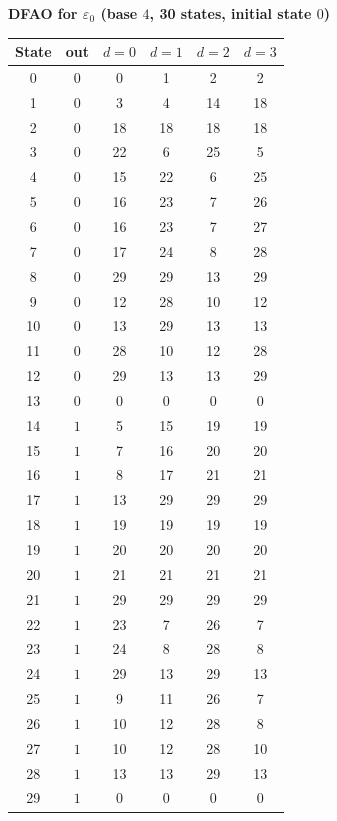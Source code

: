 \documentclass[12pt]{article}
\theoremstyle{definition}
\theoremstyle{remark}
\begin{document}
\noindent\begin{minipage}{\linewidth}
\textbf{DFAO for $\varepsilon_0$ (base $4$, 30 states, initial state $0$)}

\begin{center}
\renewcommand{\arraystretch}{1.1}
\begin{tabular}{c|c|cccc}
State & out & $d=0$ & $d=1$ & $d=2$ & $d=3$ \\\hline
0 & $0$ & 0 & 1 & 2 & 2 \\
1 & $0$ & 3 & 4 & 14 & 18 \\
2 & $0$ & 18 & 18 & 18 & 18 \\
3 & $0$ & 22 & 6 & 25 & 5 \\
4 & $0$ & 15 & 22 & 6 & 25 \\
5 & $0$ & 16 & 23 & 7 & 26 \\
6 & $0$ & 16 & 23 & 7 & 27 \\
7 & $0$ & 17 & 24 & 8 & 28 \\
8 & $0$ & 29 & 29 & 13 & 29 \\
9 & $0$ & 12 & 28 & 10 & 12 \\
10 & $0$ & 13 & 29 & 13 & 13 \\
11 & $0$ & 28 & 10 & 12 & 28 \\
12 & $0$ & 29 & 13 & 13 & 29 \\
13 & $0$ & 0 & 0 & 0 & 0 \\
14 & $1$ & 5 & 15 & 19 & 19 \\
15 & $1$ & 7 & 16 & 20 & 20 \\
16 & $1$ & 8 & 17 & 21 & 21 \\
17 & $1$ & 13 & 29 & 29 & 29 \\
18 & $1$ & 19 & 19 & 19 & 19 \\
19 & $1$ & 20 & 20 & 20 & 20 \\
20 & $1$ & 21 & 21 & 21 & 21 \\
21 & $1$ & 29 & 29 & 29 & 29 \\
22 & $1$ & 23 & 7 & 26 & 7 \\
23 & $1$ & 24 & 8 & 28 & 8 \\
24 & $1$ & 29 & 13 & 29 & 13 \\
25 & $1$ & 9 & 11 & 26 & 7 \\
26 & $1$ & 10 & 12 & 28 & 8 \\
27 & $1$ & 10 & 12 & 28 & 10 \\
28 & $1$ & 13 & 13 & 29 & 13 \\
29 & $1$ & 0 & 0 & 0 & 0 \\
\end{tabular}
\end{center}
\end{minipage}
\bigskip
\end{document}

